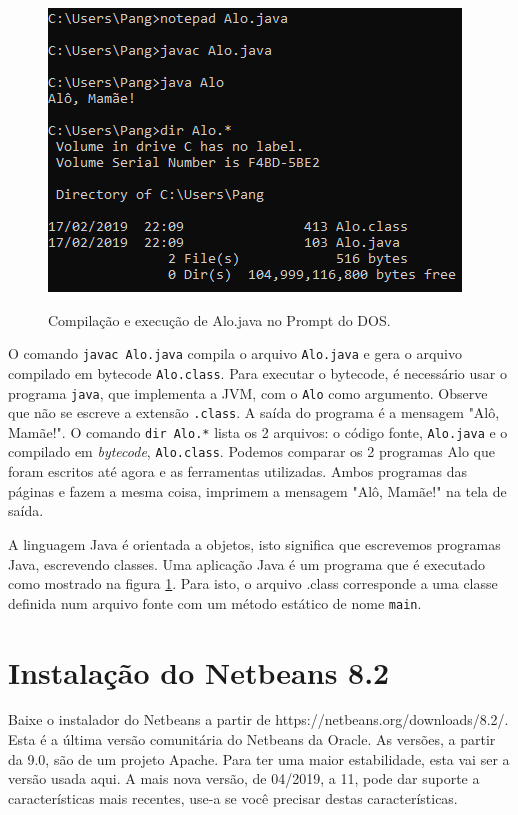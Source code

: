 \documentclass[
	12pt,				%
	twoside,			%
	a4paper,			%
	english,			%
	french,				%
	spanish,			%
	brazil				%
	]{abntex2}
\begin{document}
\begin{figure}[h]
\begin{center}
\includegraphics[scale=0.4]{compErunAlo.png} 
\caption{Compilação e execução de Alo.java no Prompt do DOS.}
\label{fig:dosExecAlo}
\end{center}
\end{figure}

O comando \texttt{javac Alo.java} compila o arquivo \texttt{Alo.java} e gera o arquivo compilado em bytecode \texttt{Alo.class}. Para executar o bytecode, é necessário usar o programa \texttt{java}, que implementa a JVM, com o \texttt{Alo} como argumento. Observe que não se escreve a extensão \texttt{.class}. A saída do programa é a mensagem "Alô, Mamãe!". O comando \texttt{dir Alo.*} lista os 2 arquivos: o código fonte, \texttt{Alo.java} e o compilado em \textit{bytecode}, \texttt{Alo.class}. Podemos comparar os 2 programas Alo que foram escritos até agora e as ferramentas utilizadas. Ambos programas das páginas \pageref{fig:code} e \pageref{prog:Alo1} fazem a mesma coisa, imprimem a mensagem "Alô, Mamãe!" na tela de saída.

A linguagem Java é orientada a objetos, isto significa que escrevemos programas Java, escrevendo classes. Uma aplicação Java é um programa que é executado como mostrado na figura \ref{fig:dosExecAlo}. Para isto, o arquivo .class corresponde a uma classe definida num arquivo fonte com um método estático de nome \texttt{main}. 

\section{Instalação do Netbeans 8.2}

Baixe o instalador do Netbeans a partir de https://netbeans.org/downloads/8.2/. Esta é a última versão comunitária do Netbeans da Oracle. As versões, a partir da 9.0, são de um projeto Apache.
Para ter uma maior estabilidade, esta vai ser a versão usada aqui. A mais nova versão, de 04/2019, a 11, pode dar suporte a características mais recentes, use-a se você precisar destas características.
\end{document}
